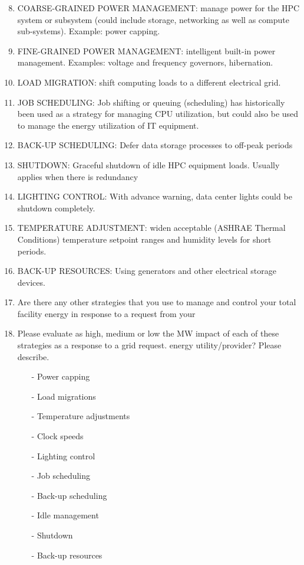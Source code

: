 \begin {enumerate}
\setcounter{enumi}{7}
\item
COARSE-GRAINED POWER MANAGEMENT: manage power for the HPC system or subsystem 
(could include storage, networking as well as compute sub-systems). Example: power capping.

\item
FINE-GRAINED POWER MANAGEMENT: intelligent built-in power management. 
Examples: voltage and frequency governors, hibernation.

\item
LOAD MIGRATION: shift computing loads to a different electrical grid. 

\item
JOB SCHEDULING: Job shifting or queuing (scheduling) has historically been used 
as a strategy for managing CPU utilization, but could also be used to manage the 
energy utilization of IT equipment.

\item
BACK-UP SCHEDULING: Defer data storage processes to off-peak periods 

\item
SHUTDOWN: Graceful shutdown of idle HPC equipment loads. Usually applies when there is redundancy

\item
LIGHTING CONTROL: With advance warning, data center lights could be shutdown completely.

\item
TEMPERATURE ADJUSTMENT: widen acceptable (ASHRAE Thermal Conditions) temperature setpoint 
ranges and humidity levels for short periods. 

\item
BACK-UP RESOURCES: Using generators and other electrical storage devices.

\item
Are there any other strategies that you use to manage and control your total 
facility energy in response to a request from your

\item
Please evaluate as high, medium or low the MW impact of each of these strategies 
as a response to a grid request. energy utility/provider? Please describe.

\begin{itemize} [nosep]
\item[{-}]
Power capping 
\item[{-}]
Load migrations	
\item[{-}]
Temperature adjustments	
\item[{-}]
Clock speeds	
\item[{-}]
Lighting control	
\item[{-}]
Job scheduling	
\item[{-}]
Back-up scheduling	
\item[{-}]
Idle management	
\item[{-}]
Shutdown	
\item[{-}]
Back-up resources	
\end{itemize}
\end{enumerate}

